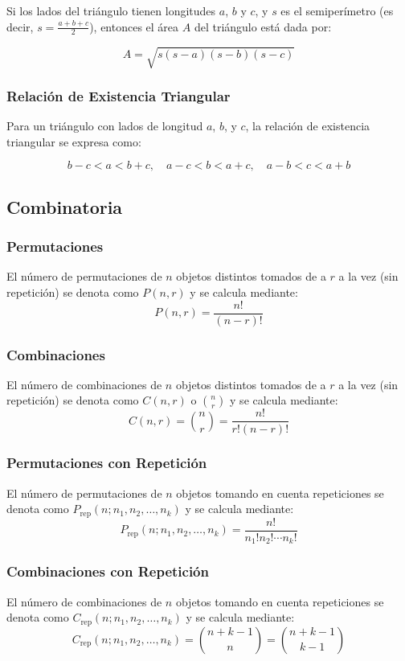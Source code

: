 Si los lados del triángulo tienen longitudes \(a\), \(b\) y \(c\), y \(s\) es el semiperímetro (es decir, \(s = \frac{a + b + c}{2}\)), entonces el área \(A\) del triángulo está dada por:

\[ A = \sqrt{s(s - a)(s - b)(s - c)} \]

\subsubsection{Relación de Existencia Triangular}

Para un triángulo con lados de longitud \(a\), \(b\), y \(c\), la relación de existencia triangular se expresa como:

\[ b - c < a < b + c, \quad a - c < b < a + c, \quad a - b < c < a + b \]

\subsection{Combinatoria}
\subsubsection{Permutaciones}
El número de permutaciones de $n$ objetos distintos tomados de a $r$ a la vez (sin repetición) se denota como $P(n, r)$ y se calcula mediante:
\[ P(n, r) = \frac{n!}{(n - r)!} \]

\subsubsection{Combinaciones}
El número de combinaciones de $n$ objetos distintos tomados de a $r$ a la vez (sin repetición) se denota como $C(n, r)$ o $\binom{n}{r}$ y se calcula mediante:
\[ C(n, r) = \binom{n}{r} = \frac{n!}{r!(n - r)!} \]

\subsubsection{Permutaciones con Repetición}
El número de permutaciones de $n$ objetos tomando en cuenta repeticiones se denota como $P_{\text{rep}}(n; n_1, n_2, \ldots, n_k)$ y se calcula mediante:
\[ P_{\text{rep}}(n; n_1, n_2, \ldots, n_k) = \frac{n!}{n_1!n_2!\cdots n_k!} \]

\subsubsection{Combinaciones con Repetición}
El número de combinaciones de $n$ objetos tomando en cuenta repeticiones se denota como $C_{\text{rep}}(n; n_1, n_2, \ldots, n_k)$ y se calcula mediante:
\[ C_{\text{rep}}(n; n_1, n_2, \ldots, n_k) = \binom{n + k - 1}{n} = \binom{n + k - 1}{k - 1} \]


